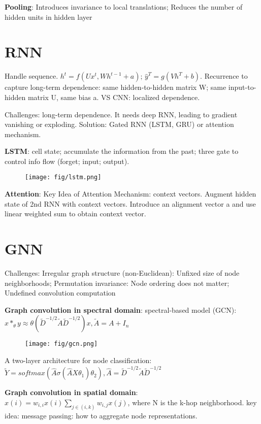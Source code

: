 \documentclass[10pt,twocolumn]{article}
\begin{document}
\textbf{Pooling}: Introduces invariance to local translations; Reduces the number of hidden units in hidden layer

\section{RNN}
Handle sequence. $h^t=f(Ux^t, Wh^{t-1}+a)$; $\hat{y}^T=g(Vh^T+b)$. Recurrence to capture long-term dependence: same hidden-to-hidden matrix W; same input-to-hidden matrix U, same bias a. VS CNN: localized dependence. 

Challenges: long-term dependence. It needs deep RNN, leading to gradient vanishing or exploding. Solution: Gated RNN (LSTM, GRU) or attention mechanism. 

\textbf{LSTM}: cell state; accumulate the information from the past; three gate to control info flow (forget; input; output). 
\begin{figure}[!ht]
    \texttt{[image: fig/lstm.png]}
\end{figure}

\textbf{Attention}: Key Idea of Attention Mechanism: context vectors. Augment hidden state of 2nd RNN with context vectors. Introduce an alignment vector a and use linear weighted sum to obtain context vector. 

\section{GNN}
Challenges: Irregular graph structure (non-Euclidean): Unfixed size of node neighborhoods; Permutation invariance: Node ordering does not matter; Undefined convolution computation

\textbf{Graph convolution in spectral domain}: spectral-based model (GCN): $x*_\theta y\approx \theta(\tilde{D}^{-1/2}\tilde{A}\tilde{D}^{-1/2})x,\tilde{A}=A+I_n$

\begin{figure}[!ht]
    \texttt{[image: fig/gcn.png]}
\end{figure}

A two-layer architecture for node classification: $\tilde{Y}=softmax(\hat{A}\sigma(\hat{A}X\theta_1)\theta_2),\hat{A}=\tilde{D}^{-1/2}\tilde{A}\tilde{D}^{-1/2}$

\textbf{Graph convolution in spatial domain}: $x(i)=w_{i,i}x(i)\sum_{j\in(i,k)}w_{i,j}x(j)$, where N is the k-hop neighborhood. key idea: message passing: how to aggregate node representations.
\end{document}
